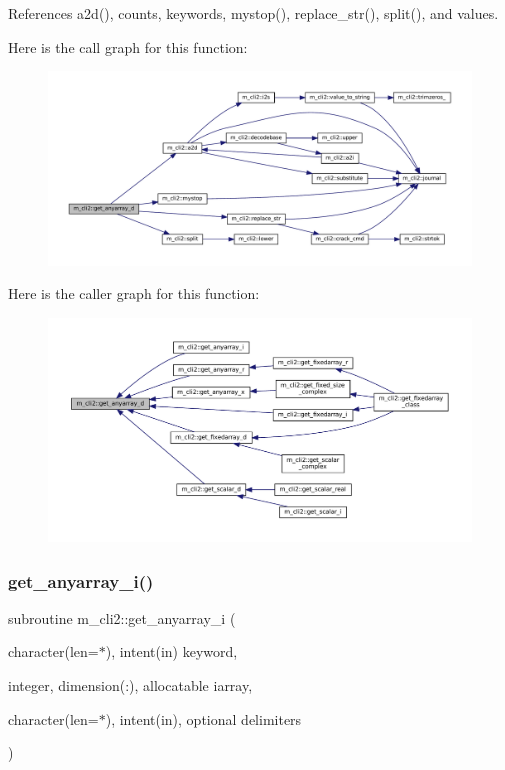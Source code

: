 References a2d(), counts, keywords, mystop(), replace\+\_\+str(), split(), and values.

Here is the call graph for this function\+:
\nopagebreak
\begin{figure}[H]
\begin{center}
\leavevmode
\includegraphics[width=350pt]{namespacem__cli2_aaede1f28172778cf45f4b6c04967bbbd_cgraph}
\end{center}
\end{figure}
Here is the caller graph for this function\+:
\nopagebreak
\begin{figure}[H]
\begin{center}
\leavevmode
\includegraphics[width=350pt]{namespacem__cli2_aaede1f28172778cf45f4b6c04967bbbd_icgraph}
\end{center}
\end{figure}
\mbox{\label{namespacem__cli2_ad314315dd5c93abff5168265f5ff0e4e}} 
\subsubsection{\texorpdfstring{get\+\_\+anyarray\+\_\+i()}{get\_anyarray\_i()}}
{\footnotesize\ttfamily subroutine m\+\_\+cli2\+::get\+\_\+anyarray\+\_\+i (\begin{DoxyParamCaption}\item[{character(len=$\ast$), intent(in)}]{keyword,  }\item[{integer, dimension(\+:), allocatable}]{iarray,  }\item[{character(len=$\ast$), intent(in), optional}]{delimiters }\end{DoxyParamCaption})\hspace{0.3cm}{\ttfamily [private]}}



